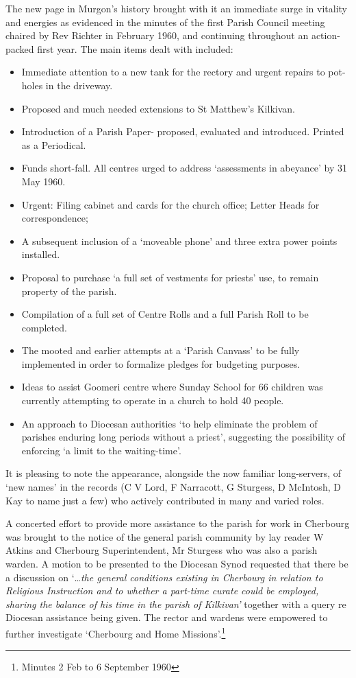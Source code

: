 The new page in Murgon's history brought with it an immediate surge in vitality and energies as evidenced in the minutes of the first Parish Council meeting chaired by Rev Richter in February 1960, and continuing throughout an action-packed first year. The main items dealt with included:

\begin{itemize}
\item
  Immediate attention to a new tank for the rectory and urgent repairs to pot-holes in the driveway.
\end{itemize}

\begin{itemize}
\item
  Proposed and much needed extensions to St Matthew's Kilkivan.
\item
  Introduction of a Parish Paper- proposed, evaluated and introduced. Printed as a Periodical.
\item
  Funds short-fall. All centres urged to address `assessments in abeyance' by 31 May 1960.
\item
  Urgent: Filing cabinet and cards for the church office; Letter Heads for correspondence;
\item
  A subsequent inclusion of a `moveable phone' and three extra power points installed.
\item
  Proposal to purchase `a full set of vestments for priests' use, to remain property of the parish.
\item
  Compilation of a full set of Centre Rolls and a full Parish Roll to be completed.
\item
  The mooted and earlier attempts at a `Parish Canvass' to be fully implemented in order to formalize pledges for budgeting purposes.
\item
  Ideas to assist Goomeri centre where Sunday School for 66 children was currently attempting to operate in a church to hold 40 people.
\item
  An approach to Diocesan authorities `to help eliminate the problem of parishes enduring long periods without a priest', suggesting the possibility of enforcing `a limit to the waiting-time'.
\end{itemize}

It is pleasing to note the appearance, alongside the now familiar long-servers, of `new names' in the records (C V Lord, F Narracott, G Sturgess, D McIntosh, D Kay to name just a few) who actively contributed in many and varied roles.

A concerted effort to provide more assistance to the parish for work in Cherbourg was brought to the notice of the general parish community by lay reader W Atkins and Cherbourg Superintendent, Mr Sturgess who was also a parish warden. A motion to be presented to the Diocesan Synod requested that there be a discussion on `\ldots{}\emph{the general conditions existing in Cherbourg in relation to Religious Instruction and to whether a part-time curate could be employed, sharing the balance of his time in the parish of Kilkivan'} together with a query re Diocesan assistance being given. The rector and wardens were empowered to further investigate `Cherbourg and Home Missions'.\footnote{Minutes 2 Feb to 6 September 1960}

